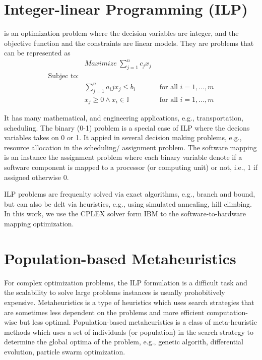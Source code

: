 \section{Integer-linear Programming (ILP)}
\ilp{} is an optimization problem where the decision variables are integer, and the objective function and the constraints are linear models.  They are problems that can be represented as 
\begin{align}
	&Maximize\ \sum_{j=1}^{n}{c_jx_j}\\
	\mbox{Subjec to:}&\\
	&\sum_{j=1}^n{a_ijx_j}\leq b_i&\mbox{ for all } i=1,...,m\\
	&x_j\geq 0 \land x_i\in \mathbb{I} &\mbox{ for all } i=1,...,m
\end{align}

It has many mathematical, and engineering applications, e.g., transportation, scheduling. The binary (0-1) problem is a special case of ILP where the decions variables takes on 0 or 1. It appied in several decision making problems, e.g., resource allocation in the scheduling/ assignment problem. The software mapping is an instance the assignment problem where each binary variable denote if a software component is mapped to a  processor (or computing unit) or not, i.e., 1 if assigned otherwise 0. 

ILP problems are frequenlty solved via exact algorithms, e.g., branch and bound, but can also be delt via heuristics, e.g., using simulated annealing, hill climbing. In this work, we use the CPLEX solver form IBM to the software-to-hardware mapping optimization.
\section{Population-based Metaheuristics}
For complex optimization problems, the ILP formulation is a difficult task and the scalability to solve large problems instances is usually prohobitively expensive. Metaheuristics is a type of heuristics which uses search strategies that are sometimes less dependent on the problems and more efficient computation-wise but less optimal. Population-based metaheuristics is a class of meta-heuristic methods which uses a set of individuals (or population) in the search strategy to determine the global optima of the problem, e.g., genetic algorith, differential evolution, particle swarm optimization.

